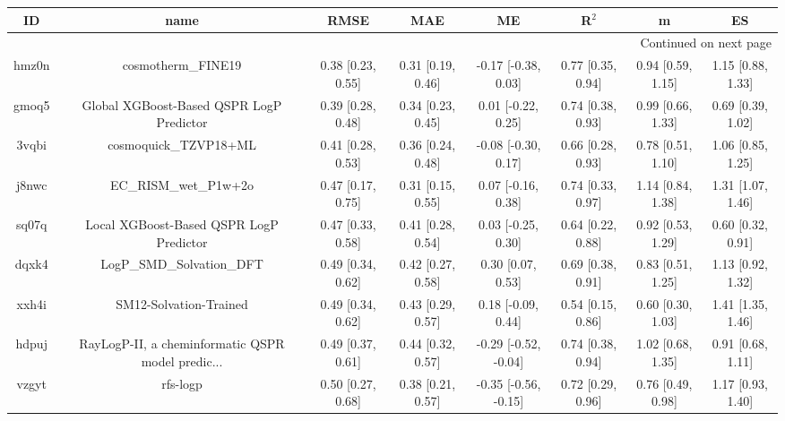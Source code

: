 \documentclass{article}
\begin{document}
\begin{center}
\begin{longtable}{|cccccccc|}
\toprule
    ID &                                               name &               RMSE &                MAE &                    ME &              R$^2$ &                    m &                    ES \\
\midrule
\endhead
\midrule
\multicolumn{8}{r}{{Continued on next page}} \\
\midrule
\endfoot

\bottomrule
\endlastfoot
 hmz0n &                                 cosmotherm\_FINE19 &  0.38 [0.23, 0.55] &  0.31 [0.19, 0.46] &   -0.17 [-0.38, 0.03] &  0.77 [0.35, 0.94] &    0.94 [0.59, 1.15] &     1.15 [0.88, 1.33] \\
 gmoq5 &           Global XGBoost-Based QSPR LogP Predictor &  0.39 [0.28, 0.48] &  0.34 [0.23, 0.45] &    0.01 [-0.22, 0.25] &  0.74 [0.38, 0.93] &    0.99 [0.66, 1.33] &     0.69 [0.39, 1.02] \\
 3vqbi &                              cosmoquick\_TZVP18+ML &  0.41 [0.28, 0.53] &  0.36 [0.24, 0.48] &   -0.08 [-0.30, 0.17] &  0.66 [0.28, 0.93] &    0.78 [0.51, 1.10] &     1.06 [0.85, 1.25] \\
 j8nwc &                              EC\_RISM\_wet\_P1w+2o &  0.47 [0.17, 0.75] &  0.31 [0.15, 0.55] &    0.07 [-0.16, 0.38] &  0.74 [0.33, 0.97] &    1.14 [0.84, 1.38] &     1.31 [1.07, 1.46] \\
 sq07q &            Local XGBoost-Based QSPR LogP Predictor &  0.47 [0.33, 0.58] &  0.41 [0.28, 0.54] &    0.03 [-0.25, 0.30] &  0.64 [0.22, 0.88] &    0.92 [0.53, 1.29] &     0.60 [0.32, 0.91] \\
 dqxk4 &                          LogP\_SMD\_Solvation\_DFT &  0.49 [0.34, 0.62] &  0.42 [0.27, 0.58] &     0.30 [0.07, 0.53] &  0.69 [0.38, 0.91] &    0.83 [0.51, 1.25] &     1.13 [0.92, 1.32] \\
 xxh4i &                             SM12-Solvation-Trained &  0.49 [0.34, 0.62] &  0.43 [0.29, 0.57] &    0.18 [-0.09, 0.44] &  0.54 [0.15, 0.86] &    0.60 [0.30, 1.03] &     1.41 [1.35, 1.46] \\
 hdpuj &  RayLogP-II, a cheminformatic QSPR model predic... &  0.49 [0.37, 0.61] &  0.44 [0.32, 0.57] &  -0.29 [-0.52, -0.04] &  0.74 [0.38, 0.94] &    1.02 [0.68, 1.35] &     0.91 [0.68, 1.11] \\
 vzgyt &                                           rfs-logp &  0.50 [0.27, 0.68] &  0.38 [0.21, 0.57] &  -0.35 [-0.56, -0.15] &  0.72 [0.29, 0.96] &    0.76 [0.49, 0.98] &     1.17 [0.93, 1.40] \\

\end{longtable}
\end{center}
\end{document}
